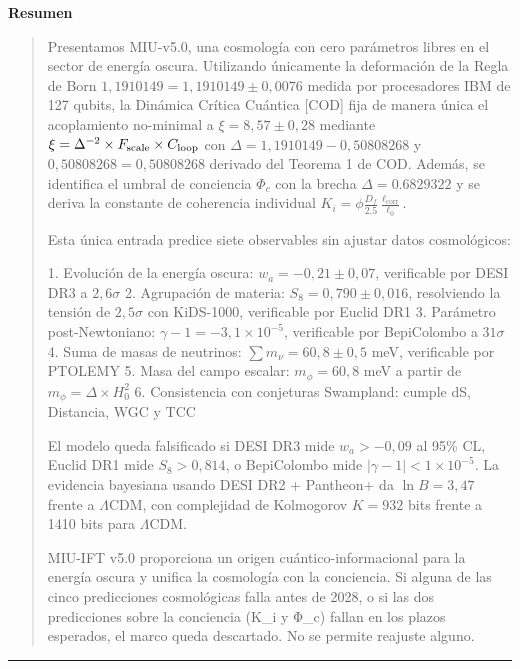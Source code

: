 \documentclass[12pt, a4paper]{article}
\theoremstyle{miuThm}
\theoremstyle{remark}
\newcommand{\qborn}{1{,}1910149}
\newcommand{\qcrit}{0{,}50808268}
\begin{document}
\bigskip
{\centering\bfseries Resumen\par}
\smallskip
\begin{quote}
\small
Presentamos MIU-v5.0, una cosmología con cero parámetros libres en el sector
de energía oscura. Utilizando únicamente la deformación de la Regla de Born
$\qborn = 1{,}1910149 \pm 0{,}0076$ medida por procesadores IBM de 127 qubits,
la Dinámica Crítica Cuántica [COD] fija de manera única el acoplamiento
no-minimal a $\xi = 8{,}57 \pm 0{,}28$ mediante $\xi = \Delta^{-2} \times
F_{\rm scale} \times C_{\rm loop}$ con $\Delta = \qborn - \qcrit$ y
$\qcrit = 0{,}50808268$ derivado del Teorema 1 de COD. Además, se identifica el umbral de conciencia $\Phi_c$ con la brecha $\Delta = 0.6829322$ y se deriva la constante de coherencia individual $K_i = \phi \frac{D_f}{2.5} \frac{\ell_{\text{corr}}}{\ell_0}$.

Esta única entrada predice siete observables sin ajustar datos cosmológicos:

1. Evolución de la energía oscura: $w_a = -0{,}21 \pm 0{,}07$, verificable
   por DESI DR3 a $2{,}6\sigma$
2. Agrupación de materia: $S_8 = 0{,}790 \pm 0{,}016$, resolviendo la tensión
   de $2{,}5\sigma$ con KiDS-1000, verificable por Euclid DR1
3. Parámetro post-Newtoniano: $\gamma - 1 = -3{,}1 \times 10^{-5}$, verificable
   por BepiColombo a $31\sigma$
4. Suma de masas de neutrinos: $\sum m_\nu = 60{,}8 \pm 0{,}5$ meV, verificable
   por PTOLEMY
5. Masa del campo escalar: $m_\phi = 60{,}8$ meV a partir de $m_\phi = \Delta \times H_0^2$
6. Consistencia con conjeturas Swampland: cumple dS, Distancia, WGC y TCC

El modelo queda falsificado si DESI DR3 mide $w_a > -0{,}09$ al 95\% CL,
Euclid DR1 mide $S_8 > 0{,}814$, o BepiColombo mide $|\gamma-1| < 1 \times 10^{-5}$.
La evidencia bayesiana usando DESI DR2 + Pantheon+ da $\ln B = 3{,}47$ frente
a $\Lambda$CDM, con complejidad de Kolmogorov $K = 932$ bits frente a 1410 bits
para $\Lambda$CDM.

MIU-IFT v5.0 proporciona un origen cuántico-informacional para la energía oscura y unifica la cosmología con la conciencia. Si alguna de las cinco predicciones cosmológicas falla antes de 2028, o si las dos predicciones sobre la conciencia (K_i y Φ_c) fallan en los plazos esperados, el marco queda descartado. No se permite reajuste alguno.
\end{quote}

\bigskip
\noindent\rule{0.85\linewidth}{0.4pt}
\bigskip
\tableofcontents
\newpage
\end{document}
